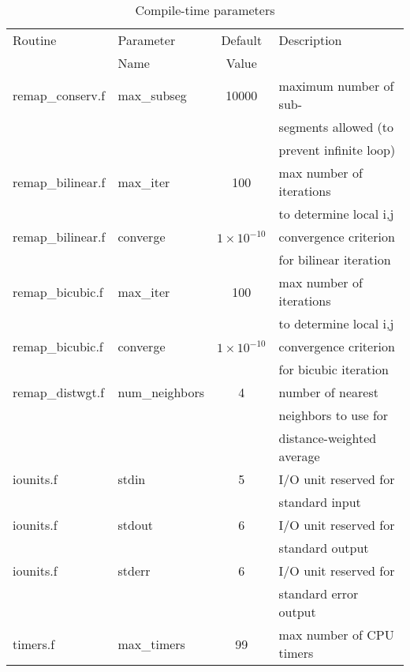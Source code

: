 \documentclass[12pt]{report}
\begin{document}
\begin{table}
\caption{Compile-time parameters \label{tab:params}}

\begin{tabular}{|l|l|c|l|} \hline
     Routine       &    Parameter     &  Default & Description  \\
                   &      Name        &   Value  &              \\ \hline
remap\_conserv.f   &  max\_subseg     &  10000   &  maximum number of sub-  \\
                   &                  &          &  segments allowed (to    \\
                   &                  &          &  prevent infinite loop)  \\
\hline
remap\_bilinear.f  &  max\_iter       &   100    &  max number of iterations \\
                   &                  &          &  to determine local i,j   \\ \hline
remap\_bilinear.f  &  converge        & $1\times 10^{-10}$
                                                 &  convergence criterion   \\
                   &                  &          &  for bilinear iteration  \\
\hline
remap\_bicubic.f   &  max\_iter       &   100    &  max number of iterations \\
                   &                  &          &  to determine local i,j   \\ \hline
remap\_bicubic.f   &  converge        & $1\times 10^{-10}$
                                                 &  convergence criterion   \\
                   &                  &          &  for bicubic iteration  \\
\hline
remap\_distwgt.f   &  num\_neighbors  &    4     &  number of nearest       \\
                   &                  &          &  neighbors to use for    \\
                   &                  &          &  distance-weighted average\\
\hline
iounits.f          &  stdin           &    5     &  I/O unit reserved for \\
                   &                  &          &  standard input \\ \hline
iounits.f          &  stdout          &    6     &  I/O unit reserved for \\
                   &                  &          &  standard output \\ \hline
iounits.f          &  stderr          &    6     &  I/O unit reserved for \\
                   &                  &          &  standard error output \\
\hline
timers.f           &  max\_timers     &   99     &  max number of CPU timers \\
\hline
\end{tabular}
\end{table}
\end{document}
